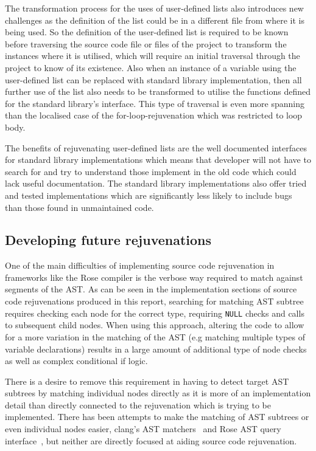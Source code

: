 \documentclass[bsc,frontabs,singlespacing,twoside,parskip,deptreport]{infthesis}
\begin{document}
The transformation process for the uses of user-defined lists also introduces new challenges as the definition of the list could be in a different file from where it is being used. So the definition of the user-defined list is required to be known before traversing the source code file or files of the project to transform the instances where it is utilised, which will require an initial traversal through the project to know of its existence. Also when an instance of a variable using the user-defined list can be replaced with standard library implementation, then all further use of the list also needs to be transformed to utilise the functions defined for the standard library's interface. This type of traversal is even more spanning than the localised case of the for-loop-rejuvenation which was restricted to loop body.

The benefits of rejuvenating user-defined lists are the well documented interfaces for standard library implementations which means that developer will not have to search for and try to understand those implement in the old code which could lack useful documentation. The standard library implementations also offer tried and tested implementations which are significantly less likely to include bugs than those found in unmaintained code.

\subsection{Developing future rejuvenations}
One of the main difficulties of implementing source code rejuvenation in frameworks like the Rose compiler is the verbose way required to match against segments of the AST. As can be seen in the implementation sections of source code rejuvenations produced in this report, searching for matching AST subtree requires checking each node for the correct type, requiring \texttt{NULL} checks and calls to subsequent child nodes. When using this approach, altering the code to allow for a more variation in the matching of the AST (e.g matching multiple types of variable declarations) results in a large amount of additional type of node checks as well as complex conditional if logic. 

There is a desire to remove this requirement in having to detect target AST subtrees by matching individual nodes directly as it is more of an implementation detail than directly connected to the rejuvenation which is trying to be implemented. There has been attempts to make the matching of AST subtrees or even individual nodes easier, clang's AST matchers~\cite{CLANG_MATCH_AST} and Rose AST query interface~\cite{ROSE_TUT_AST_QUERY}, but neither are directly focused at aiding source code rejuvenation. 
\end{document}
